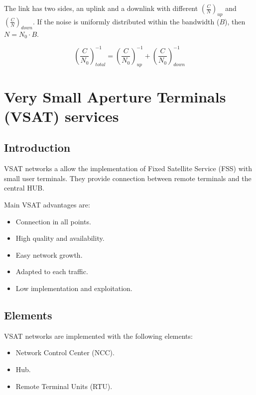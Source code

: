 \documentclass[../main.tex]{subfiles}
\begin{document}
The link has two sides, an uplink and a downlink with different $\left( \frac {C} {N} \right)_{up}$ and $\left( \frac {C} {N} \right)_{down}$. If the noise is uniformly distributed within the bandwidth ($B$), then $N = N_0 \cdot B$.

$$
	\left( \frac {C} {N_0} \right)_{total}^{-1} = \left( \frac {C} {N_0} \right)_{up}^{-1} + \left( \frac {C} {N_0} \right)_{down}^{-1}
$$

\section{Very Small Aperture Terminals (VSAT) services}

\subsection{Introduction}

VSAT networks a allow the implementation of Fixed Satellite Service (FSS) with small user terminals. They provide connection between remote terminals and the central HUB.

Main VSAT advantages are:
\begin{itemize}
	\item Connection in all points.
	\item High quality and availability.
	\item Easy network growth.
	\item Adapted to each traffic.
	\item Low implementation and exploitation.
\end{itemize}

\subsection{Elements}

VSAT networks are implemented with the following elements:
\begin{itemize}
	\item Network Control Center (NCC).
	\item Hub.
	\item Remote Terminal Units (RTU).
\end{itemize}
\end{document}
